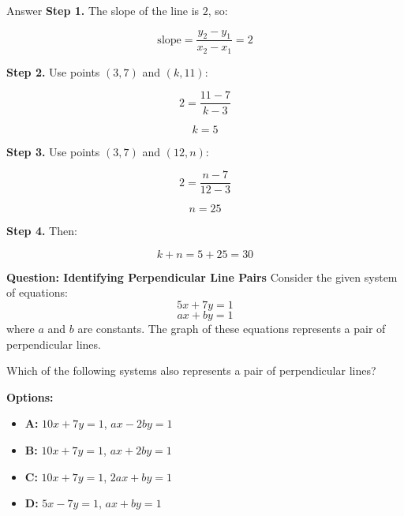 \documentclass{beamer}
\begin{document}
\begin{frame}{Answer}
\footnotesize
\textbf{Step 1.} The slope of the line is $2$, so:

\[
\text{slope} = \frac{y_2 - y_1}{x_2 - x_1} = 2
\]

\vspace{0.5em}
\textbf{Step 2.} Use points $(3,7)$ and $(k,11)$:

\[
2 = \frac{11 - 7}{k - 3}
\]

\[
k = 5
\]

\vspace{0.5em}
\textbf{Step 3.} Use points $(3,7)$ and $(12,n)$:

\[
2 = \frac{n - 7}{12 - 3}
\]

\[
n = 25
\]

\vspace{0.5em}
\textbf{Step 4.} Then:

\[
k + n = 5 + 25 = \boxed{30}
\]

\end{frame}


\begin{frame}{\textbf{Question: Identifying Perpendicular Line Pairs}}
    \small
    Consider the given system of equations:
    \[
    5x + 7y = 1
    \]
    \[
    ax + by = 1
    \]
    where \( a \) and \( b \) are constants. The graph of these equations represents a pair of perpendicular lines.

    \vspace{0.3cm}
    Which of the following systems also represents a pair of perpendicular lines?

    \vspace{0.4cm}
    \textbf{Options:}
    \begin{itemize}
        \item \textbf{A:} \( 10x + 7y = 1 \), \quad \( ax - 2by = 1 \)
        \item \textbf{B:} \( 10x + 7y = 1 \), \quad \( ax + 2by = 1 \)
        \item \textbf{C:} \( 10x + 7y = 1 \), \quad \( 2ax + by = 1 \)
        \item \textbf{D:} \( 5x - 7y = 1 \), \quad \( ax + by = 1 \)
    \end{itemize}
\end{frame}
\end{document}
